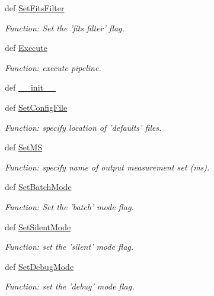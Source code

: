 \begin{DoxyCompactItemize}
def \hyperlink{class_pipeline_1_1_pipeline_aea681f505e21deef324bb10d9866a137}{\-Set\-Fits\-Filter}
\begin{DoxyCompactList}\small\item\em \-Function\-: \-Set the 'fits filter' flag. \end{DoxyCompactList}\item 
def \hyperlink{class_pipeline_1_1_pipeline_aebb8b640e2cdf9ace841c24b594c359e}{\-Execute}
\begin{DoxyCompactList}\small\item\em \-Function\-: execute pipeline. \end{DoxyCompactList}\item 
def \hyperlink{class_pipeline_1_1_pipeline_a9471fe47c5f99217c0696e6eb828c2ea}{\-\_\-\-\_\-init\-\_\-\-\_\-}
\item 
def \hyperlink{class_pipeline_1_1_pipeline_ad0e2d0768b23a2d2d5e154d696a21317}{\-Set\-Config\-File}
\begin{DoxyCompactList}\small\item\em \-Function\-: specify location of 'defaults' files. \end{DoxyCompactList}\item 
def \hyperlink{class_pipeline_1_1_pipeline_aa43ebf2ad90e152edb6b92911521f6e9}{\-Set\-M\-S}
\begin{DoxyCompactList}\small\item\em \-Function\-: specify name of output measurement set (ms). \end{DoxyCompactList}\item 
def \hyperlink{class_pipeline_1_1_pipeline_a138f65f6617383b8758831b33ea42442}{\-Set\-Batch\-Mode}
\begin{DoxyCompactList}\small\item\em \-Function\-: \-Set the 'batch' mode flag. \end{DoxyCompactList}\item 
def \hyperlink{class_pipeline_1_1_pipeline_a762dfb493445bcfc9c1e44f8a93f7400}{\-Set\-Silent\-Mode}
\begin{DoxyCompactList}\small\item\em \-Function\-: set the 'silent' mode flag. \end{DoxyCompactList}\item 
def \hyperlink{class_pipeline_1_1_pipeline_adb78acb8c9e486e7eb6a7e830140efe1}{\-Set\-Debug\-Mode}
\begin{DoxyCompactList}\small\item\em \-Function\-: set the 'debug' mode flag. \end{DoxyCompactList}\item 

\end{DoxyCompactItemize}
